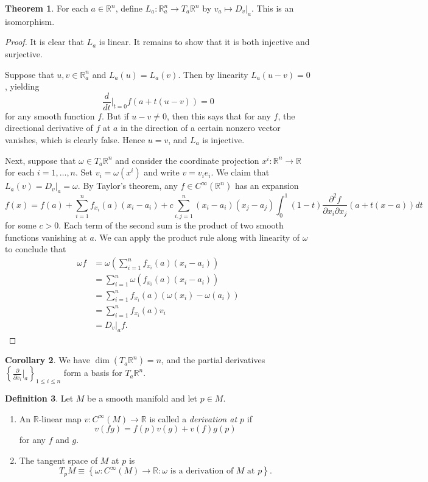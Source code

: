 \documentclass[10pt,letterpaper,cm]{nupset}
\theoremstyle{definition}
\newtheorem{definition}{Definition}[subsection]
\theoremstyle{theorem}
\newtheorem{theorem}[definition]{Theorem}
\newtheorem{corollary}[definition]{Corollary}
\theoremstyle{remark}
\newcommand{\R}{\mathbb R}
\newcommand{\1}{\mathbf{1}}
\newcommand{\0}{\vec 0}
\begin{document}
\begin{theorem}
For each $a \in \R^n$, define $L_a : \R_a^n \to T_a\R^n$ by $v_a \mapsto D_v\bigr\rvert_a$. This is an isomorphism. 
\end{theorem}
\begin{proof}
It is clear that $L_a$ is linear. It remains to show that it is both injective and surjective. 

\medskip


Suppose that $u, v \in \R_a^n$ and $L_a(u) = L_a(v)$. Then by linearity $L_a(u-v) = 0$, yielding $$\frac{d}{d{t}}\bigr\rvert_{t=0} f(a + t(u-v)) = 0$$ for any smooth function $f$. But if $u-v \ne 0$, then this says that for any $f$, the directional derivative of $f$ at $a$ in the direction of a certain nonzero vector vanishes, which is clearly false. Hence $u=v$, and $L_a$ is injective. 

\medskip


Next, suppose that $\omega \in T_a\R^n$ and consider the coordinate projection $x^i : \R^n \to \R$ for each $i=1, \ldots, n$. Set $v_i = \omega(x^i)$ and write $v= v_ie_i$. We claim that $L_a(v) = D_v\bigr\rvert_a = \omega$. By Taylor's theorem, any $f\in C^{\infty}(\R^n)$ has an expansion $$f(x) = f(a) + \sum_{i=1}^n f_{x_i}(a)(x_i-a_i) + c\sum_{i, j=1}^n(x_i - a_i)(x_j-a_j) \int_{0}^1(1-t) \frac{\partial^2{f}}{\partial{x_i}\partial{x_j}}\left(a+t(x-a)\right)dt$$ for some $c >0$. Each term of the second sum is the product of two smooth functions vanishing at $a$. We can apply the product rule along with linearity of $\omega$ to conclude that 
\begin{align*}
\omega f & = \omega \left(\sum_{i=1}^n f_{x_i}(a)(x_i-a_i)\right) 
\\ & =\sum_{i=1}^n \omega(f_{x_i}(a)(x_i -a_i)) 
\\ & = \sum_{i=1}^n f_{x_i}(a)( \omega(x_i) -\omega(a_i))
\\ & = \sum_{i=1}^n f_{x_i}(a)v_i 
\\ & =  D_v\bigr\rvert_a f.
\end{align*}
\end{proof}

\begin{corollary}
We have $\dim(T_a\R^n) = n$, and the partial derivatives $\left\{\frac{\partial}{\partial{x_i}}\bigr\rvert_a\right\}_{1\leq i \leq n}$ form a basis for $T_a\R^n$. 
\end{corollary}

\begin{definition} Let $M$ be a smooth manifold and let $p\in M$.
\begin{enumerate}
\item An $\R$-linear map $v: C^{\infty}(M) \to \R$ is called a \textit{derivation at $p$} if $$v(fg) = f(p)v(g) + v(f)g(p)$$ for any $f$ and $g$.
\item The tangent space of $M$ at $p$ is 
$$T_pM \equiv \left\{\omega : C^{\infty}(M) \to \R : \omega \text{ is a derivation of $M$ at }p\right\}.$$
\end{enumerate}
\end{definition}
\end{document}
